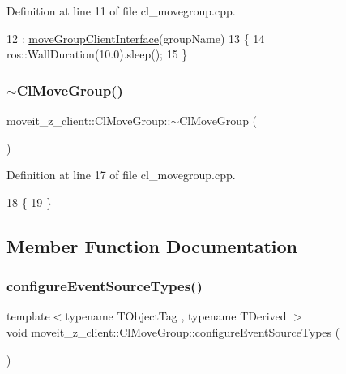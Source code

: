 Definition at line 11 of file cl\+\_\+movegroup.\+cpp.


\begin{DoxyCode}
12     : \hyperlink{classmoveit__z__client_1_1ClMoveGroup_af86e046b837be0ef4afa9893d8808f20}{moveGroupClientInterface}(groupName)
13 \{
14     ros::WallDuration(10.0).sleep();
15 \}
\end{DoxyCode}
\mbox{\label{classmoveit__z__client_1_1ClMoveGroup_afa1dba464d3b7b175b492c0010456c15}} 
\subsubsection{\texorpdfstring{$\sim$\+Cl\+Move\+Group()}{~ClMoveGroup()}}
{\footnotesize\ttfamily moveit\+\_\+z\+\_\+client\+::\+Cl\+Move\+Group\+::$\sim$\+Cl\+Move\+Group (\begin{DoxyParamCaption}{ }\end{DoxyParamCaption})\hspace{0.3cm}{\ttfamily [virtual]}}



Definition at line 17 of file cl\+\_\+movegroup.\+cpp.


\begin{DoxyCode}
18 \{
19 \}
\end{DoxyCode}


\subsection{Member Function Documentation}
\mbox{\label{classmoveit__z__client_1_1ClMoveGroup_a8a30517bb61f09dadf486a1cb93aef8b}} 
\subsubsection{\texorpdfstring{configure\+Event\+Source\+Types()}{configureEventSourceTypes()}}
{\footnotesize\ttfamily template$<$typename T\+Object\+Tag , typename T\+Derived $>$ \\
void moveit\+\_\+z\+\_\+client\+::\+Cl\+Move\+Group\+::configure\+Event\+Source\+Types (\begin{DoxyParamCaption}{ }\end{DoxyParamCaption})\hspace{0.3cm}{\ttfamily [inline]}}



